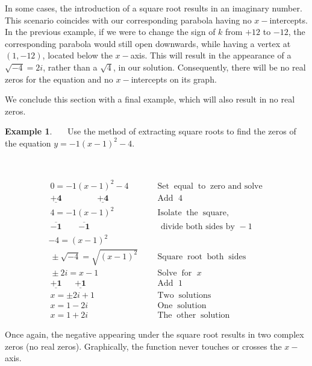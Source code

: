 \documentclass[12pt]{book}
\theoremstyle{definition}
\newtheorem{example}{Example}
\newcommand{\tmmathbf}[1]{\ensuremath{\boldsymbol{#1}}}
\newcommand{\tmop}[1]{\ensuremath{\operatorname{#1}}}
\begin{document}
In some cases, the introduction of a square root results in an imaginary number.  This scenario coincides with our corresponding parabola having no $x-$intercepts.  In the previous example, if we were to change the sign of $k$ from $+12$ to $-12$, the corresponding parabola would still open downwards, while having a vertex at $(1,-12)$, located below the $x-$axis.  This will result in the appearance of a $\sqrt{-4}=2i$, rather than a $\sqrt{4}$, in our solution.  Consequently, there will be no real zeros for the equation and no $x-$intercepts on its graph.\par
We conclude this section with a final example, which will also result in no real zeros.

\begin{example}~~~Use the method of extracting square roots to find the zeros of the equation $y = -1(x-1)^2-4$.
\begin{multicols}{2}
\ \par
\begin{center}
\end{center}

\columnbreak

\begin{eqnarray*}
    \ 0 = -1(x-1)^2-4 &  &  \tmop{Set} \tmop{equal} \tmop{to} \tmop{zero~and~solve}\\
    \ \tmmathbf{\underline{+4}~~~~~~~~~~~~~~~~~~~\underline{+4}}   & & \tmop{Add~}4\\
		\ 4 = -1(x-1)^2~~~~~ & &  \tmop{Isolate} \tmop{the} \tmop{square,}\\
		\ \tmmathbf{\overline{-1}~~~~~~~~~\overline{-1}}~~~~~~~~~~ & & ~~~\text{divide~both~sides~by~}-1\\
		-4 = (x-1)^2~~~~~&&\\
    \ \pm\sqrt{-4} = \sqrt{(x-1)^2}~~ & & \tmop{Square} \tmop{root} \tmop{both} \tmop{sides}\\
		\ \pm2i = x - 1~~~~~~~~~& &  \tmop{Solve} \tmop{for~}x\\
		\ \tmmathbf{\underline{+1}~~~~~~~\underline{+1}}~~~~~~~~~  & &  \tmop{Add~}1\\
		\ x=\pm2i +1~~~~~~~ & & \tmop{Two} \tmop{solutions} \\
		\ x=1 - 2i~~~~~~~~~ & & \tmop{One} \tmop{solution}\\
		\ x=1 + 2i~~~~~~~~~ & & \tmop{The} \tmop{other} \tmop{solution}
  \end{eqnarray*}
\end{multicols}
\end{example}
Once again, the negative appearing under the square root results in two complex zeros (no real zeros).  Graphically, the function never touches or crosses the $x-$axis.
\end{document}
